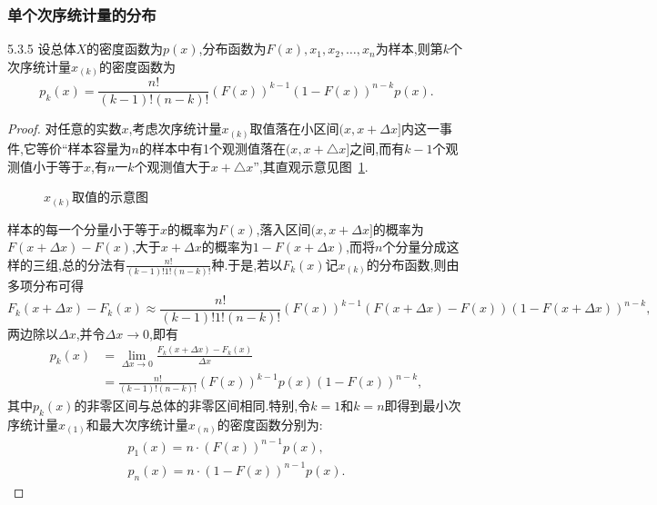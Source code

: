 \subsubsection{单个次序统计量的分布}
\begin{theorem}{}{5.3.5}
设总体$X$的密度函数为$p(x)$,分布函数为$F(x),x_1,x_2,\dotsc,x_n$为样本,则第$k$个次序统计量$x_{(k)}$的密度函数为
\begin{equation}\label{eq:5.3.13}
p_k(x)=\frac{n!}{(k-1)!(n-k)!}(F(x))^{k-1}(1-F(x))^{n-k}p(x).
\end{equation}
\end{theorem}
\begin{proof}
对任意的实数$x$,考虑次序统计量$x_{(k)}$取值落在小区间$(x,x+\Delta x]$内这一事件,它等价``样本容量为$n$的样本中有1个观测值落在$(x,x+△x]$之间,而有$k-1$个观测值小于等于$x$,有$n一k$个观测值大于$x+△x$'',其直观示意见图~\ref{fig:5.3.5}.
\begin{figure}[!ht]
  \centering
{}
  \caption{$x_{(k)}$取值的示意图}\label{fig:5.3.5}
\end{figure}

样本的每一个分量小于等于$x$的概率为$F(x)$,落入区间$(x,x+\Delta x]$的概率为$F(x+\Delta x)-F(x)$,大于$x+\Delta x$的概率为$1-F(x+\Delta x)$,而将$n$个分量分成这样的三组,总的分法有$\frac{n!}{(k-1)!1!(n-k)!}$种.于是,若以$F_k(x)$记$x_{(k)}$的分布函数,则由多项分布可得
\[F_k(x+\Delta x)-F_k(x)\approx\frac{n!}{(k-1)!1!(n-k)!}(F(x))^{k-1}(F(x+\Delta x)-F(x))(1-F(x+\Delta x))^{n-k},\]
两边除以$\Delta x$,并令$\Delta x\to0$,即有
\begin{align*}
p_k(x)&=\lim_{\Delta x\to0}\frac{F_k(x+\Delta x)-F_k(x)}{\Delta x}\\
&=\frac{n!}{(k-1)!(n-k)!}(F(x))^{k-1}p(x)(1-F(x))^{n-k},
\end{align*}
其中$p_k(x)$的非零区间与总体的非零区间相同.特别,令$k=1$和$k=n$即得到最小次序统计量$x_{(1)}$和最大次序统计量$x_{(n)}$的密度函数分别为:
\begin{gather}
p_1(x)=n\cdot(F(x))^{n-1}p(x),\label{eq:5.3.14}\\
p_n(x)=n\cdot(1-F(x))^{n-1}p(x).\label{eq:5.3.15}
\end{gather}
\end{proof}
